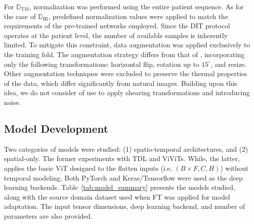 \documentclass[runningheads]{llncs}
\begin{document}
For $\mathbb{D}_{\mathrm{TM}}$, normalization was performed using the entire
patient sequence. As for the case of $\mathbb{D}_{\mathrm{IR}}$, predefined
normalization values were applied to match the requirements of the
pre-trained networks employed.  Since the \ac{DIT} protocol operates
at the patient level, the number of available samples is inherently
limited. To mitigate this constraint, data augmentation was applied
exclusively to the training fold. The augmentation strategy differs
from that of \cite{DeMatheus2023}, incorporating only the following
transformations: horizontal flip, rotation up to $15^{\circ}$, and
resize. Other augmentation techniques were excluded to preserve the
thermal properties of the data, which differ significantly from
natural images. Building upon this idea, we do not consider of use to
apply shearing transformations and introducing noise. 




\subsection{Model Development}
\label{sec:model-development}

Two categories of models were studied: (1) spatio-temporal
architectures, and (2) spatial-only. The former experiments with
\ac{TDL} and \ac{ViViTs}. While, the latter, applies the basic
\ac{ViT} designed to the flatten inputs (i.e.  $(B\times F, C, H)$)
without temporal modeling. Both PyTorch and Keras/Tensorflow were used
as the deep learning backends. Table~\ref{tab:model_summary} presents
the models studied, along with the source domain dataset used when
\ac{FT} was applied for model adaptation. The input tensor dimensions,
deep learning backend, and number of parameters are also provided. 

\end{document}
